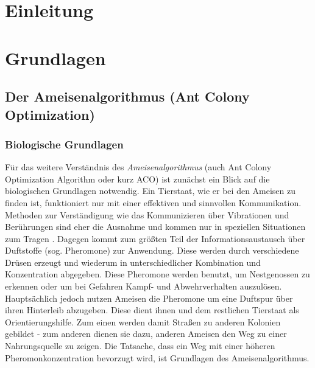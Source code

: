 \documentclass[doktyp=barbeit, sprache=german]{TUBAFarbeiten}
\begin{document}
\maketitle
\TUBAFErklaerungsseite
\tableofcontents
\newpage
\section{Einleitung}
\section{Grundlagen}
\subsection{Der Ameisenalgorithmus (Ant Colony Optimization)}
\subsubsection{Biologische Grundlagen}
Für das weitere Verständnis des \textit{Ameisenalgorithmus} (auch Ant Colony Optimization Algorithm oder kurz ACO) ist zunächst ein Blick auf die biologischen Grundlagen notwendig. Ein Tierstaat, wie er bei den Ameisen zu finden ist, funktioniert nur mit einer effektiven und sinnvollen Kommunikation. Methoden zur Verständigung wie das Kommunizieren über Vibrationen und Berührungen sind eher die Ausnahme und kommen nur in speziellen Situationen zum Tragen \cite{Ameisen}. Dagegen kommt zum größten Teil der Informationsaustausch über Duftstoffe (sog. Pheromone) zur Anwendung. Diese werden durch verschiedene Drüsen erzeugt und wiederum in unterschiedlicher Kombination und Konzentration abgegeben.
Diese Pheromone werden benutzt, um Nestgenossen zu erkennen oder um bei Gefahren Kampf- und Abwehrverhalten auszulösen. Hauptsächlich jedoch nutzen Ameisen die Pheromone um eine Duftspur über ihren Hinterleib abzugeben. Diese dient ihnen und dem restlichen Tierstaat als Orientierungshilfe. Zum einen werden damit Straßen zu anderen Kolonien gebildet - zum anderen dienen sie dazu, anderen Ameisen den Weg zu einer Nahrungsquelle zu zeigen. Die Tatsache, dass ein Weg mit einer höheren Pheromonkonzentration bevorzugt wird, ist Grundlagen des Ameisenalgorithmus.
\end{document}
